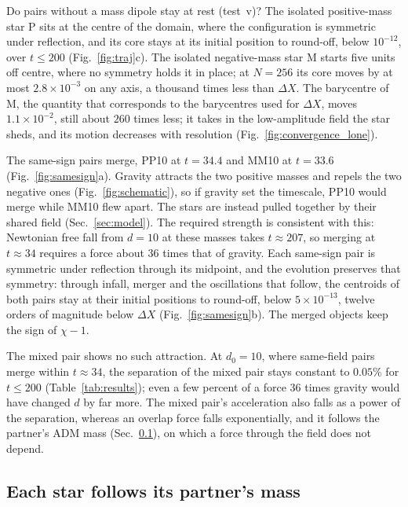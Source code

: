 \documentclass[twocolumn,floatfix,aps,prd,superscriptaddress,nofootinbib]{revtex4-2}
\begin{document}
Do pairs without a mass dipole stay at rest (test~v)? The isolated positive-mass star P sits at the centre of the domain, where the configuration is symmetric under reflection, and its core stays at its initial position to round-off, below $10^{-12}$, over $t\le200$ (Fig.~\ref{fig:traj}c). The isolated negative-mass star M starts five units off centre, where no symmetry holds it in place; at $N=256$ its core moves by at most $2.8\times10^{-3}$ on any axis, a thousand times less than $\Delta X$. The barycentre of M, the quantity that corresponds to the barycentres used for $\Delta X$, moves $1.1\times10^{-2}$, still about $260$ times less; it takes in the low-amplitude field the star sheds, and its motion decreases with resolution (Fig.~\ref{fig:convergence_lone}).

The same-sign pairs merge, PP10 at $t=34.4$ and MM10 at $t=33.6$ (Fig.~\ref{fig:samesign}a). Gravity attracts the two positive masses and repels the two negative ones (Fig.~\ref{fig:schematic}), so if gravity set the timescale, PP10 would merge while MM10 flew apart. The stars are instead pulled together by their shared field (Sec.~\ref{sec:model}). The required strength is consistent with this: Newtonian free fall from $d=10$ at these masses takes $t\approx207$, so merging at $t\approx34$ requires a force about $36$ times that of gravity. Each same-sign pair is symmetric under reflection through its midpoint, and the evolution preserves that symmetry: through infall, merger and the oscillations that follow, the centroids of both pairs stay at their initial positions to round-off, below $5\times10^{-13}$, twelve orders of magnitude below $\Delta X$ (Fig.~\ref{fig:samesign}b). The merged objects keep the sign of $\chi-1$.

The mixed pair shows no such attraction. At $d_0=10$, where same-field pairs merge within $t\approx34$, the separation of the mixed pair stays constant to $0.05\%$ for $t\le200$ (Table~\ref{tab:results}); even a few percent of a force $36$ times gravity would have changed $d$ by far more. The mixed pair's acceleration also falls as a power of the separation, whereas an overlap force falls exponentially, and it follows the partner's ADM mass (Sec.~\ref{sec:scaling}), on which a force through the field does not depend.

\subsection{Each star follows its partner's mass}
\label{sec:scaling}
\end{document}
